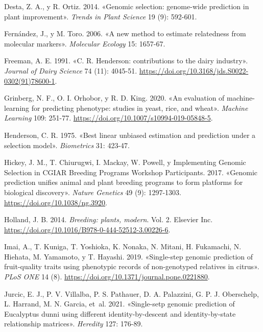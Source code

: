 \documentclass[11pt,spanish,a4paper,oneside,]{book} %
\begin{document}
\leavevmode\hypertarget{ref-cite:10}{}%
Desta, Z. A., y R. Ortiz. 2014. «Genomic selection: genome-wide prediction in plant improvement». \emph{Trends in Plant Science} 19 (9): 592-601.

\leavevmode\hypertarget{ref-cite:24}{}%
Fernández, J., y M. Toro. 2006. «A new method to estimate relatedness from molecular markers». \emph{Molecular Ecology} 15: 1657-67.

\leavevmode\hypertarget{ref-cite:28}{}%
Freeman, A. E. 1991. «C. R. Henderson: contributions to the dairy industry». \emph{Journal of Dairy Science} 74 (11): 4045-51. \url{https://doi.org/10.3168/jds.S0022-0302(91)78600-1}.

\leavevmode\hypertarget{ref-cite:35}{}%
Grinberg, N. F., O. I. Orhobor, y R. D. King. 2020. «An evaluation of machine-learning for predicting phenotype: studies in yeast, rice, and wheat». \emph{Machine Learning} 109: 251-77. \url{https://doi.org/10.1007/s10994-019-05848-5}.

\leavevmode\hypertarget{ref-cite:41}{}%
Henderson, C. R. 1975. «Best linear unbiased estimation and prediction under a selection model». \emph{Biometrics} 31: 423-47.

\leavevmode\hypertarget{ref-cite:44}{}%
Hickey, J. M., T. Chiurugwi, I. Mackay, W. Powell, y Implementing Genomic Selection in CGIAR Breeding Programs Workshop Participants. 2017. «Genomic prediction unifies animal and plant breeding programs to form platforms for biological discovery». \emph{Nature Genetics} 49 (9): 1297-1303. \url{https://doi.org/10.1038/ng.3920}.

\leavevmode\hypertarget{ref-cite:43}{}%
Holland, J. B. 2014. \emph{Breeding: plants, modern}. Vol. 2. Elsevier Inc. \url{https://doi.org/10.1016/B978-0-444-52512-3.00226-6}.

\leavevmode\hypertarget{ref-cite:20}{}%
Imai, A., T. Kuniga, T. Yoshioka, K. Nonaka, N. Mitani, H. Fukamachi, N. Hiehata, M. Yamamoto, y T. Hayashi. 2019. «Single-step genomic prediction of fruit-quality traits using phenotypic records of non-genotyped relatives in citrus». \emph{PLoS ONE} 14 (8). \url{https://doi.org/10.1371/journal.pone.0221880}.

\leavevmode\hypertarget{ref-cite:11}{}%
Jurcic, E. J., P. V. Villalba, P. S. Pathauer, D. A. Palazzini, G. P. J. Oberschelp, L. Harrand, M. N. Garcia, et~al. 2021. «Single-setp genomic prediction of Eucalyptus dunni using different identity-by-descent and identity-by-state relationship matrices». \emph{Heredity} 127: 176-89.
\end{document}
